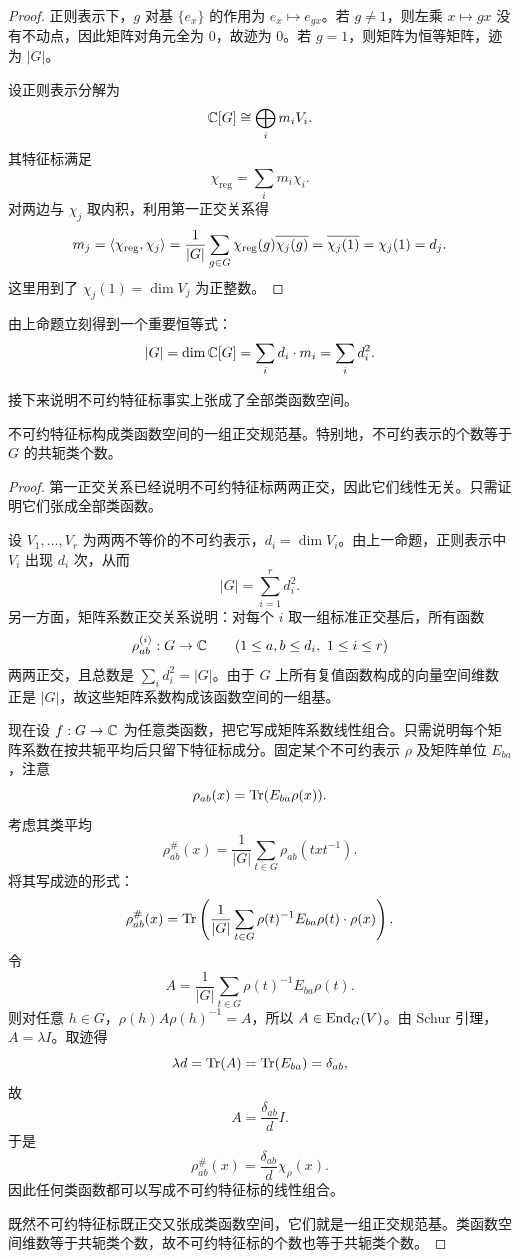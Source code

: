 \begin{proof}
正则表示下，$g$ 对基 $\{e_x\}$ 的作用为 $e_x\mapsto e_{gx}$。若 $g\neq 1$，则左乘 $x\mapsto gx$ 没有不动点，因此矩阵对角元全为 $0$，故迹为 $0$。若 $g=1$，则矩阵为恒等矩阵，迹为 $|G|$。

设正则表示分解为
\[
\mathbb{C}[G]\cong \bigoplus_i m_iV_i.
\]
其特征标满足
\[
\chi_{\mathrm{reg}}=\sum_i m_i\chi_i.
\]
对两边与 $\chi_j$ 取内积，利用第一正交关系得
\[
m_j=\langle \chi_{\mathrm{reg}}, \chi_j \rangle
=\frac{1}{|G|}\sum_{g\in G}\chi_{\mathrm{reg}}(g)\overline{\chi_j(g)}
=\overline{\chi_j(1)}=\chi_j(1)=d_j.
\]
这里用到了 $\chi_j(1)=\dim V_j$ 为正整数。
\end{proof}

由上命题立刻得到一个重要恒等式：
\[
|G|=\dim \mathbb{C}[G]=\sum_i d_i\cdot m_i=\sum_i d_i^2.
\]

接下来说明不可约特征标事实上张成了全部类函数空间。

\begin{theorem}
不可约特征标构成类函数空间的一组正交规范基。特别地，不可约表示的个数等于 $G$ 的共轭类个数。
\end{theorem}

\begin{proof}
第一正交关系已经说明不可约特征标两两正交，因此它们线性无关。只需证明它们张成全部类函数。

设 $V_1,\dots,V_r$ 为两两不等价的不可约表示，$d_i=\dim V_i$。由上一命题，正则表示中 $V_i$ 出现 $d_i$ 次，从而
\[
|G|=\sum_{i=1}^r d_i^2.
\]
另一方面，矩阵系数正交关系说明：对每个 $i$ 取一组标准正交基后，所有函数
\[
\rho^{(i)}_{ab}:G\to \mathbb{C} \qquad (1\le a,b\le d_i,
\ 1\le i\le r)
\]
两两正交，且总数是 $\sum_i d_i^2=|G|$。由于 $G$ 上所有复值函数构成的向量空间维数正是 $|G|$，故这些矩阵系数构成该函数空间的一组基。

现在设 $f:G\to \mathbb{C}$ 为任意类函数，把它写成矩阵系数线性组合。只需说明每个矩阵系数在按共轭平均后只留下特征标成分。固定某个不可约表示 $\rho$ 及矩阵单位 $E_{ba}$，注意
\[
\rho_{ab}(x)=\mathrm{Tr}(E_{ba}\rho(x)).
\]
考虑其类平均
\[
\rho_{ab}^{\#}(x)=\frac{1}{|G|}\sum_{t\in G}\rho_{ab}(txt^{-1}).
\]
将其写成迹的形式：
\[
\rho_{ab}^{\#}(x)=\mathrm{Tr}\left(\frac{1}{|G|}\sum_{t\in G}\rho(t)^{-1}E_{ba}\rho(t)\cdot \rho(x)\right).
\]
令
\[
A=\frac{1}{|G|}\sum_{t\in G}\rho(t)^{-1}E_{ba}\rho(t).
\]
则对任意 $h\in G$，$\rho(h)A\rho(h)^{-1}=A$，所以 $A\in \mathrm{End}_G(V)$。由 Schur 引理，$A=\lambda I$。取迹得
\[
\lambda d=\mathrm{Tr}(A)=\mathrm{Tr}(E_{ba})=\delta_{ab},
\]
故
\[
A=\frac{\delta_{ab}}{d}I.
\]
于是
\[
\rho_{ab}^{\#}(x)=\frac{\delta_{ab}}{d}\chi_\rho(x).
\]
因此任何类函数都可以写成不可约特征标的线性组合。

既然不可约特征标既正交又张成类函数空间，它们就是一组正交规范基。类函数空间维数等于共轭类个数，故不可约特征标的个数也等于共轭类个数。
\end{proof}

